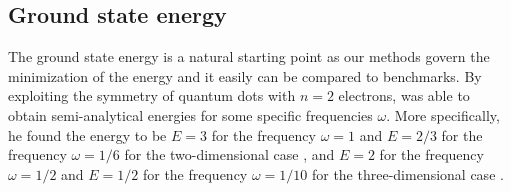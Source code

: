 \subsection{Ground state energy} \label{sec:groundstateenergy}
The ground state energy is a natural starting point as our methods govern the minimization of the energy and it easily can be compared to benchmarks. By exploiting the symmetry of quantum dots with $n=2$ electrons, \citeauthor{taut_two_1993} was able to obtain semi-analytical energies for some specific frequencies $\omega$. More specifically, he found the energy to be $E=3$ for the frequency $\omega=1$ and $E=2/3$ for the frequency $\omega=1/6$ for the two-dimensional case \cite{taut_two_1993}, and $E=2$ for the frequency $\omega=1/2$ and $E=1/2$ for the frequency $\omega=1/10$ for the three-dimensional case \cite{taut_two_1994}.

